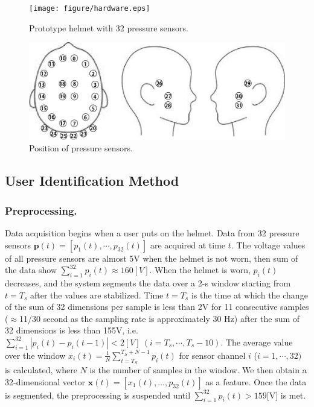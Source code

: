 \documentclass[sigconf,authordraft]{acmart}
\begin{document}
\begin{figure}[!t]
    \centering
    \texttt{[image: figure/hardware.eps]}
  \caption{Prototype helmet with 32 pressure sensors.}
  \label{fig:hard}
\end{figure}

\begin{figure}[!t]
  \begin{center}
    \includegraphics[width=1\linewidth]{figure/position.eps}
  \end{center}
  \caption{Position of pressure sensors.}
  \label{fig:position}
\end{figure}


\subsection{User Identification Method}

\subsubsection{Preprocessing.}
Data acquisition begins when a user puts on the helmet. Data from 32 pressure sensors $\bm{p}(t)=[p_1(t),\cdots,p_{32}(t)]$ are acquired at time $t$. The voltage values of all pressure sensors are almost 5V when the helmet is not worn, then sum of the data show $\sum_{i=1}^{32}p_i(t)\approx160[V]$. When the helmet is worn, $p_i(t)$ decreases, and the system segments the data over a 2-s window starting from $t=T_s$ after the values are stabilized. Time $t=T_s$ is the time at which the change of the sum of 32 dimensions per sample is less than 2V for 11 consecutive samples ($\approx$11/30 second as the sampling rate is approximately 30 Hz) after the sum of 32 dimensions is less than 155V, i.e. $\sum_{i=1}^{32}|p_i(t)-p_i(t-1)|<2[V]~(i=T_s,\cdots,T_s-10)$. The average value over the window $x_i(t)=\frac{1}{N}\sum_{t=T_S}^{T_S+N-1}p_i(t)$ for sensor channel $i$ ($i=1,\cdots,32)$ is calculated, where $N$ is the number of samples in the window. We then obtain a 32-dimensional vector $\bm{x}(t)=[x_{1}(t),\dots,p_{32}(t)]$ as a feature. Once the data is segmented, the preprocessing is suspended until $\sum_{i=1}^{32}p_i(t)>159$[V] is met.
\end{document}
